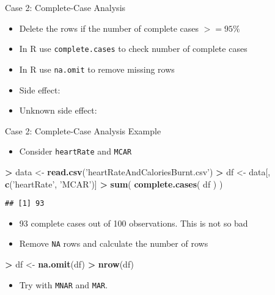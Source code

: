 \documentclass[ignorenonframetext,]{beamer}
\newenvironment{Shaded}{\begin{snugshade}}{\end{snugshade}}
\newcommand{\KeywordTok}[1]{\textcolor[rgb]{0.13,0.29,0.53}{\textbf{#1}}}
\newcommand{\StringTok}[1]{\textcolor[rgb]{0.31,0.60,0.02}{#1}}
\newcommand{\OperatorTok}[1]{\textcolor[rgb]{0.81,0.36,0.00}{\textbf{#1}}}
\newcommand{\NormalTok}[1]{#1}
\providecommand{\tightlist}{%
  \setlength{\itemsep}{0pt}\setlength{\parskip}{0pt}}
\begin{document}
\begin{frame}[fragile]{Case 2: Complete-Case Analysis}

\begin{itemize}
\tightlist
\item
  Delete the rows if the number of complete cases \(>=95\%\)
\item
  In R use \texttt{complete.cases} to check number of complete cases
\item
  In R use \texttt{na.omit} to remove missing rows
\item
  Side effect: \color{red}{waste of information}
\item
  Unknown side effect: \color{red}{introduces bias if MAR}
\end{itemize}

\end{frame}

\begin{frame}[fragile]{Case 2: Complete-Case Analysis Example}

\begin{itemize}
\tightlist
\item
  Consider \texttt{heartRate} and \texttt{MCAR}
\end{itemize}

\begin{Shaded}
\begin{Highlighting}[]
\OperatorTok{>}\StringTok{ }\NormalTok{data <-}\StringTok{ }\KeywordTok{read.csv}\NormalTok{(}\StringTok{'heartRateAndCaloriesBurnt.csv'}\NormalTok{)}
\OperatorTok{>}\StringTok{ }\NormalTok{df   <-}\StringTok{ }\NormalTok{data[, }\KeywordTok{c}\NormalTok{(}\StringTok{'heartRate'}\NormalTok{, }\StringTok{'MCAR'}\NormalTok{)]}
\OperatorTok{>}\StringTok{ }\KeywordTok{sum}\NormalTok{(  }\KeywordTok{complete.cases}\NormalTok{( df ) )}
\end{Highlighting}
\end{Shaded}

\begin{verbatim}
## [1] 93
\end{verbatim}

\begin{itemize}
\tightlist
\item
  93 complete cases out of 100 observations. This is not so bad
\item
  Remove \texttt{NA} rows and calculate the number of rows
\end{itemize}

\begin{Shaded}
\begin{Highlighting}[]
\OperatorTok{>}\StringTok{ }\NormalTok{df  <-}\StringTok{ }\KeywordTok{na.omit}\NormalTok{(df)}
\OperatorTok{>}\StringTok{ }\KeywordTok{nrow}\NormalTok{(df)}
\end{Highlighting}
\end{Shaded}

\begin{itemize}
\tightlist
\item
  Try with \texttt{MNAR} and \texttt{MAR}.
\end{itemize}

\end{frame}
\end{document}
